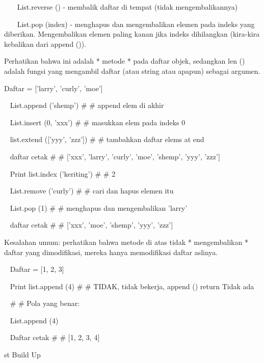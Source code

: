 ~~~ List.reverse () - membalik daftar di tempat (tidak mengembalikannya) \par
~~~ List.pop (index) - menghapus dan mengembalikan elemen pada indeks yang diberikan. Mengembalikan elemen paling kanan jika indeks dihilangkan (kira-kira kebalikan dari append ()). \par
\vspace{12pt}
Perhatikan bahwa ini adalah * metode * pada daftar objek, sedangkan len () adalah fungsi yang mengambil daftar (atau string atau apapun) sebagai argumen. \par
\vspace{12pt}
\vspace{12pt}
Daftar = ['larry', 'curly', 'moe'] \par
~ List.append ('shemp')  $  \#  $ $  \#  $ append elem di akhir \par
~ List.insert (0, 'xxx')  $  \#  $ $  \#  $ masukkan elem pada indeks 0 \par
~ list.extend (['yyy', 'zzz'])  $  \#  $ $  \#  $ tambahkan daftar elems at end \par
~ daftar cetak  $  \#  $ $  \#  $ ['xxx', 'larry', 'curly', 'moe', 'shemp', 'yyy', 'zzz'] \par
~ Print list.index ('keriting')  $  \#  $ $  \#  $ 2 \par
\vspace{12pt}
~ List.remove ('curly')  $  \#  $ $  \#  $ cari dan hapus elemen itu \par
~ List.pop (1)  $  \#  $ $  \#  $ menghapus dan mengembalikan 'larry' \par
~ daftar cetak  $  \#  $ $  \#  $ ['xxx', 'moe', 'shemp', 'yyy', 'zzz'] \par
\vspace{12pt}
Kesalahan umum: perhatikan bahwa metode di atas tidak * mengembalikan * daftar yang dimodifikasi, mereka hanya memodifikasi daftar aslinya. \par
\vspace{12pt}
~ Daftar = [1, 2, 3] \par
~ Print list.append (4)  $  \#  $ $  \#  $ TIDAK, tidak bekerja, append () return Tidak ada \par
~  $  \#  $ $  \#  $ Pola yang benar: \par
~ List.append (4) \par
~ Daftar cetak  $  \#  $ $  \#  $ [1, 2, 3, 4] \par
st Build Up \par
\vspace{12pt}
